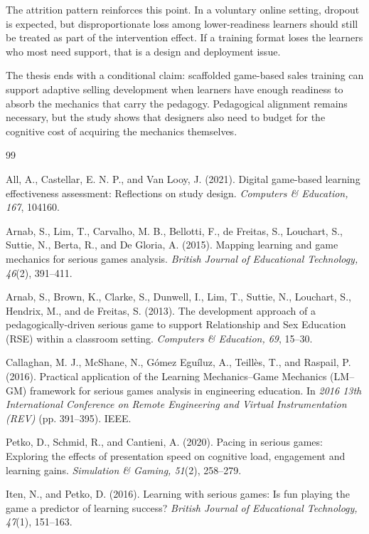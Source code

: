 \documentclass[12pt]{report}
\begin{document}
The attrition pattern reinforces this point. In a voluntary online setting, dropout is expected, but disproportionate loss among lower-readiness learners should still be treated as part of the intervention effect. If a training format loses the learners who most need support, that is a design and deployment issue.

The thesis ends with a conditional claim: scaffolded game-based sales training can support adaptive selling development when learners have enough readiness to absorb the mechanics that carry the pedagogy. Pedagogical alignment remains necessary, but the study shows that designers also need to budget for the cognitive cost of acquiring the mechanics themselves.

\begin{thebibliography}{99}

All, A., Castellar, E. N. P., and Van Looy, J. (2021).
Digital game-based learning effectiveness assessment: Reflections on study design.
\textit{Computers \& Education, 167}, 104160.

Arnab, S., Lim, T., Carvalho, M. B., Bellotti, F., de Freitas, S., Louchart, S., Suttie, N., Berta, R., and De Gloria, A. (2015).
Mapping learning and game mechanics for serious games analysis.
\textit{British Journal of Educational Technology, 46}(2), 391--411.

Arnab, S., Brown, K., Clarke, S., Dunwell, I., Lim, T., Suttie, N., Louchart, S., Hendrix, M., and de Freitas, S. (2013).
The development approach of a pedagogically-driven serious game to support Relationship and Sex Education (RSE) within a classroom setting.
\textit{Computers \& Education, 69}, 15--30.

Callaghan, M. J., McShane, N., G\'omez Egu\'iluz, A., Teill\`es, T., and Raspail, P. (2016).
Practical application of the Learning Mechanics--Game Mechanics (LM--GM) framework for serious games analysis in engineering education.
In \textit{2016 13th International Conference on Remote Engineering and Virtual Instrumentation (REV)} (pp. 391--395). IEEE.

Petko, D., Schmid, R., and Cantieni, A. (2020).
Pacing in serious games: Exploring the effects of presentation speed on cognitive load, engagement and learning gains.
\textit{Simulation \& Gaming, 51}(2), 258--279.

Iten, N., and Petko, D. (2016).
Learning with serious games: Is fun playing the game a predictor of learning success?
\textit{British Journal of Educational Technology, 47}(1), 151--163.


\end{thebibliography}
\end{document}

